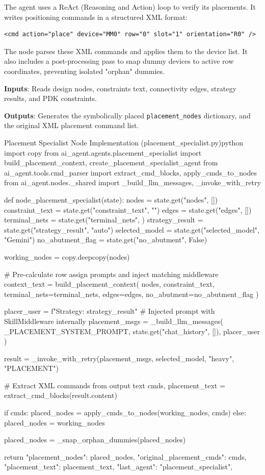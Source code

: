 The agent uses a ReAct (Reasoning and Action) loop to verify its placements. It writes positioning commands in a structured XML format:
\begin{lstlisting}[language=text]
<cmd action="place" device="MM0" row="0" slot="1" orientation="R0" />
\end{lstlisting}
The node parses these XML commands and applies them to the device list. It also includes a post-processing pass to snap dummy devices to active row coordinates, preventing isolated "orphan" dummies.

\textbf{Inputs}: Reads design nodes, constraints text, connectivity edges, strategy results, and PDK constraints.

\textbf{Outputs}: Generates the symbolically placed \texttt{placement\_nodes} dictionary, and the original XML placement command list.

\begin{thesiscode}{Placement Specialist Node Implementation (placement\_specialist.py)}{python}
import copy
from ai_agent.agents.placement_specialist import build_placement_context, create_placement_specialist_agent
from ai_agent.tools.cmd_parser import extract_cmd_blocks, apply_cmds_to_nodes
from ai_agent.nodes._shared import _build_llm_messages, _invoke_with_retry

def node_placement_specialist(state):
    nodes = state.get("nodes", [])
    constraint_text = state.get("constraint_text", "")
    edges = state.get("edges", [])
    terminal_nets = state.get("terminal_nets", {})
    strategy_result = state.get("strategy_result", "auto")
    selected_model = state.get("selected_model", "Gemini")
    no_abutment_flag = state.get("no_abutment", False)

    working_nodes = copy.deepcopy(nodes)
    
    # Pre-calculate row assign prompts and inject matching middleware
    context_text = build_placement_context(
        nodes, constraint_text, terminal_nets=terminal_nets,
        edges=edges, no_abutment=no_abutment_flag
    )
    
    placer_user = f"Strategy: {strategy_result}\n{}"
    # Injected prompt with SkillMiddleware internally
    placement_msgs = _build_llm_messages(
        _PLACEMENT_SYSTEM_PROMPT, state.get("chat_history", []), placer_user
    )
    
    result = _invoke_with_retry(placement_msgs, selected_model, "heavy", "PLACEMENT")
    
    # Extract XML commands from output text
    cmds, placement_text = extract_cmd_blocks(result.content)
    
    if cmds:
        placed_nodes = apply_cmds_to_nodes(working_nodes, cmds)
    else:
        placed_nodes = working_nodes

    placed_nodes = _snap_orphan_dummies(placed_nodes)

    return {
        "placement_nodes": placed_nodes,
        "original_placement_cmds": cmds,
        "placement_text": placement_text,
        "last_agent": "placement_specialist",
    }
\end{thesiscode}

